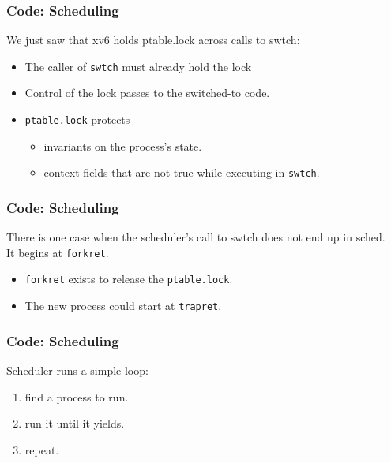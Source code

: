 \documentclass{beamer}
\begin{document}

\begin{frame}[t]
  \frametitle{Code: Scheduling}
  We just saw that xv6 holds ptable.lock across calls to swtch:

  \begin{itemize}
  \item The caller of \texttt{swtch} must already hold the lock
  \item Control of the lock passes to the switched-to code.
  \item \texttt{ptable.lock} protects
    \begin{itemize}
    \item invariants on the process's state.
    \item context fields that are not true while executing in \texttt{swtch}.
    \end{itemize}
  \end{itemize}
  
\end{frame}


\begin{frame}[t]
  \frametitle{Code: Scheduling}
  There is one case when the scheduler's call to swtch does not end up in sched.\\
  It begins at \texttt{forkret}.
  \begin{itemize}
  \item \texttt{forkret} exists to release the \texttt{ptable.lock}.
  \item The new process could start at \texttt{trapret}.
  \end{itemize}
  
\end{frame}


\begin{frame}[t]
  \frametitle{Code: Scheduling}
  Scheduler runs a simple loop:
  \begin{enumerate}
  \item find a process to run.
  \item run it until it yields.
  \item repeat.
  \end{enumerate}
  
\end{frame}
\end{document}
